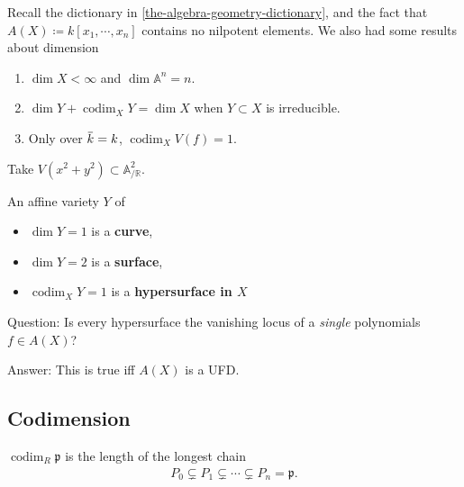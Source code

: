 Recall the dictionary in \cref{the-algebra-geometry-dictionary}, and the
fact that \(A(X) \coloneqq k[x_1, \cdots, x_{n}]\) contains no nilpotent
elements. We also had some results about dimension

\begin{enumerate}
\def\labelenumi{\arabic{enumi}.}
\tightlist
\item
  \(\dim X<\infty\) and \(\dim {\mathbb{A}}^n = n\).
\item
  \(\dim Y + \operatorname{codim}_X Y = \dim X\) when \(Y\subset X\) is
  irreducible.
\item
  Only over
  \(\mkern 1.5mu\overline{\mkern-1.5muk\mkern-1.5mu}\mkern 1.5mu = k\),
  \(\operatorname{codim}_X V(f) = 1\).
\end{enumerate}

\begin{example}

Take \(V(x^2+y^2) \subset {\mathbb{A}}^2_{/{\mathbb{R}}}\).

\end{example}

\begin{definition}

An affine variety \(Y\) of

\begin{itemize}
\tightlist
\item
  \(\dim Y = 1\) is a \textbf{curve},
\item
  \(\dim Y = 2\) is a \textbf{surface},
\item
  \(\operatorname{codim}_X Y = 1\) is a \textbf{hypersurface in \(X\)}
\end{itemize}

\end{definition}

Question: Is every hypersurface the vanishing locus of a \emph{single}
polynomials \(f\in A(X)\)?

Answer: This is true iff \(A(X)\) is a UFD.

\hypertarget{codimension}{%
\subsection{Codimension}\label{codimension}}

\begin{definition}

\(\operatorname{codim}_R {\mathfrak{p}}\) is the length of the longest
chain
\begin{align*}P_0 \subsetneq P_1 \subsetneq \cdots \subsetneq P_n = {\mathfrak{p}}.\end{align*}

\end{definition}

